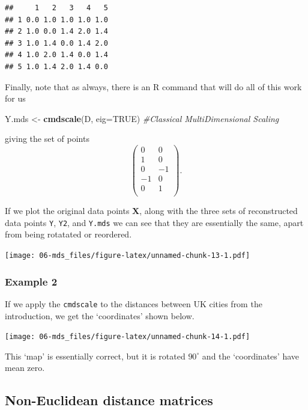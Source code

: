 \documentclass[
]{book}
\newenvironment{Shaded}{\begin{snugshade}}{\end{snugshade}}
\newcommand{\AttributeTok}[1]{\textcolor[rgb]{0.13,0.29,0.53}{#1}}
\newcommand{\CommentTok}[1]{\textcolor[rgb]{0.56,0.35,0.01}{\textit{#1}}}
\newcommand{\ConstantTok}[1]{\textcolor[rgb]{0.56,0.35,0.01}{#1}}
\newcommand{\FunctionTok}[1]{\textcolor[rgb]{0.13,0.29,0.53}{\textbf{#1}}}
\newcommand{\NormalTok}[1]{#1}
\newcommand{\OtherTok}[1]{\textcolor[rgb]{0.56,0.35,0.01}{#1}}
\theoremstyle{definition}
\theoremstyle{definition}
\theoremstyle{definition}
\theoremstyle{definition}
\theoremstyle{remark}
\begin{document}
\begin{verbatim}
##     1   2   3   4   5
## 1 0.0 1.0 1.0 1.0 1.0
## 2 1.0 0.0 1.4 2.0 1.4
## 3 1.0 1.4 0.0 1.4 2.0
## 4 1.0 2.0 1.4 0.0 1.4
## 5 1.0 1.4 2.0 1.4 0.0
\end{verbatim}

Finally, note that as always, there is an R command that will do all of this work for us

\begin{Shaded}
\begin{Highlighting}[]
\NormalTok{Y.mds }\OtherTok{\textless{}{-}} \FunctionTok{cmdscale}\NormalTok{(D, }\AttributeTok{eig=}\ConstantTok{TRUE}\NormalTok{) }\CommentTok{\#Classical MultiDimensional Scaling}
\end{Highlighting}
\end{Shaded}

giving the set of points
\[\begin{pmatrix}0&0 \\1&0 \\0&-1 \\-1&0 \\0&1 \\\end{pmatrix}.\]

If we plot the original data points \(\mathbf X\), along with the three sets of reconstructed data points \texttt{Y}, \texttt{Y2}, and \texttt{Y.mds} we can see that they are essentially the same, apart from being rotatated or reordered.

\texttt{[image: 06-mds\_files/figure-latex/unnamed-chunk-13-1.pdf]}

\subsubsection*{Example 2}\label{example-2}

If we apply the \texttt{cmdscale} to the distances between UK cities from the introduction, we get the `coordinates' shown below.

\texttt{[image: 06-mds\_files/figure-latex/unnamed-chunk-14-1.pdf]}

This `map' is essentially correct, but it is rotated \(90^\circ\) and the `coordinates' have mean zero.

\subsection{Non-Euclidean distance matrices}\label{non-euclidean-distance-matrices}
\end{document}
